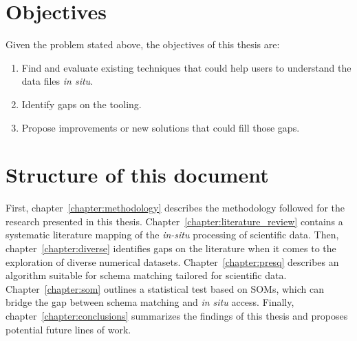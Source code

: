 \section{Objectives}


Given the problem stated above, the objectives of this thesis are:

\begin{enumerate}
    \item Find and evaluate existing techniques that could help users to understand the data files
        \emph{in situ}.
    \item Identify gaps on the tooling.
    \item Propose improvements or new solutions that could fill those gaps.
    \label{enum:objectives}
\end{enumerate}

\section{Structure of this document}

First, chapter~\ref{chapter:methodology} describes the methodology followed for the
research presented in this thesis. Chapter~\ref{chapter:literature_review} contains
a systematic literature mapping of the \emph{in-situ} processing of scientific data.
Then, chapter~\ref{chapter:diverse} identifies gaps on the literature when it comes
to the exploration of diverse numerical datasets.
Chapter~\ref{chapter:presq} describes an algorithm
suitable for schema matching tailored for scientific data. Chapter~\ref{chapter:som}
outlines a statistical test based on \glspl{SOM}, which can bridge the gap
between schema matching and \emph{in situ} access. Finally, chapter~\ref{chapter:conclusions}
summarizes the findings of this thesis and proposes potential future lines of work.
